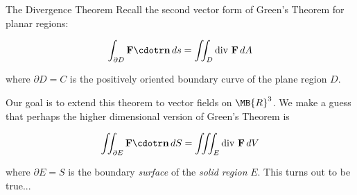 \documentclass[11pt,english,
handout
]{beamer}
\begin{document}


\makebeamertitle












\begin{frame}{The Divergence Theorem}
\small
Recall the second vector form of Green's Theorem for planar regions:

\[
\int_{\partial D}\mathbf{F}\cdotr\mathbf{n}\,ds=\iint_D\text{div }\mathbf{F}\,dA
\]

where $\partial D=C$ is the positively oriented boundary curve of the plane region $D$. \pause

\lspace
Our goal is to extend this theorem to vector fields on $\MB{R}^3$. \pause We make a guess that perhaps the higher dimensional version of Green's Theorem is

\[
\iint_{\partial E}\mathbf{F}\cdotr\mathbf{n}\,dS=\iiint_E\text{div }\mathbf{F}\,dV
\]

where $\partial E=S$ is the boundary \textit{surface} of the \textit{solid region} $E$. \pause This turns out to be true...
\end{frame}
\end{document}
